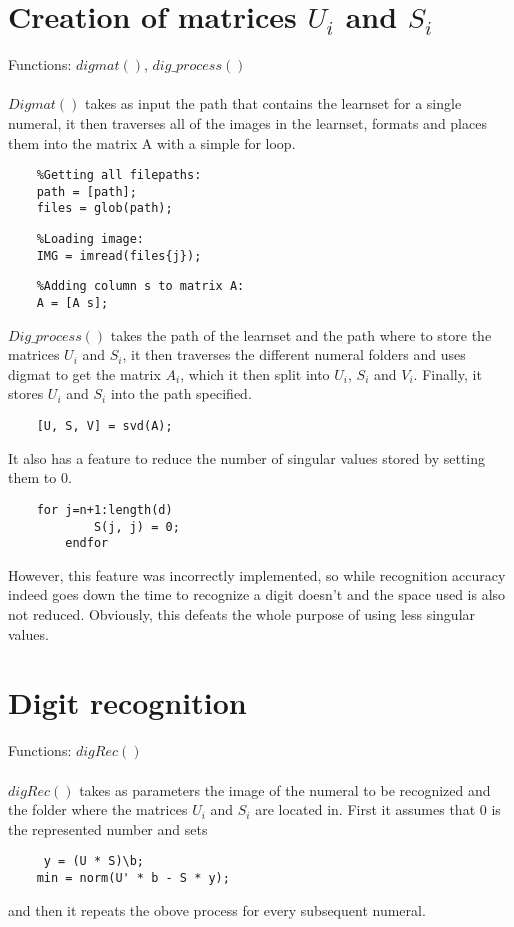 \documentclass{article}
\begin{document}
	\section{Creation of matrices $U_i$ and $S_i$}
	Functions: $digmat()$, $dig\_process()$
	
	\paragraph{}
	$Digmat()$ takes as input the path that contains the learnset for a single numeral, it then traverses all of the images in the learnset, formats and places them into the matrix A with a simple for loop.
	\begin{lstlisting}
	%Getting all filepaths:
	path = [path];
	files = glob(path);
	\end{lstlisting}
	\begin{lstlisting}
	%Loading image:
	IMG = imread(files{j});
	\end{lstlisting}
	\begin{lstlisting}
	%Adding column s to matrix A:
	A = [A s];
	\end{lstlisting}
	$Dig\_process()$ takes the path of the learnset and the path where to store the matrices $U_i$ and $S_i$, it then traverses the different numeral folders and uses digmat to get the matrix $A_i$, which it then split into $U_i$, $S_i$ and $V_i$.
	 Finally, it stores $U_i$ and $S_i$ into the path specified.
	\begin{lstlisting}
	[U, S, V] = svd(A);
	\end{lstlisting}
	It also has a feature to reduce the number of singular values stored by setting them to 0.
	\begin{lstlisting}
	for j=n+1:length(d)
      		S(j, j) = 0;
    	endfor 
	\end{lstlisting}
	However, this feature was incorrectly implemented, so while recognition accuracy indeed goes down the time to recognize a digit doesn’t and the space used is also not reduced. Obviously, this defeats the whole purpose of using less singular values.
	
	\section{Digit recognition}
	Functions: $digRec()$
	
	\paragraph{}
	$digRec()$ takes as parameters the image of the numeral to be recognized and the folder where the matrices $U_i$ and $S_i$ are located in. 
	First it assumes that 0 is the represented number and sets 
	\begin{lstlisting}
	 y = (U * S)\b;
 	min = norm(U' * b - S * y); 
	\end{lstlisting}
	and then it repeats the obove process for every subsequent numeral.
	
\end{document}
